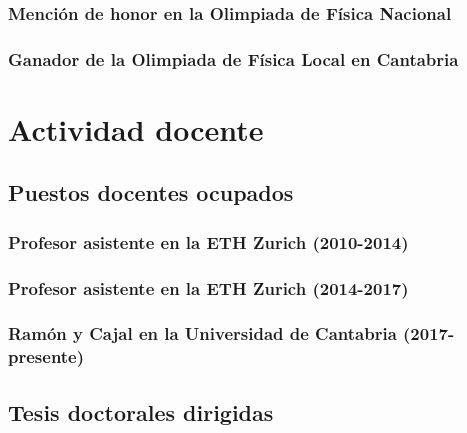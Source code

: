 \documentclass[a4paper, 11pt, twoside, openright]{report}
\begin{document}
\subsection{Mención de honor en la Olimpiada de Física Nacional}

\subsection{Ganador de la Olimpiada de Física Local en Cantabria}




\chapter{Actividad docente}

\section{Puestos docentes ocupados}
\subsection{Profesor asistente en la ETH Zurich (2010-2014)}


\subsection{Profesor asistente en la ETH Zurich (2014-2017)}


\subsection{Ramón y Cajal en la Universidad de Cantabria (2017-presente)}



\section{Tesis doctorales dirigidas}
\end{document}
